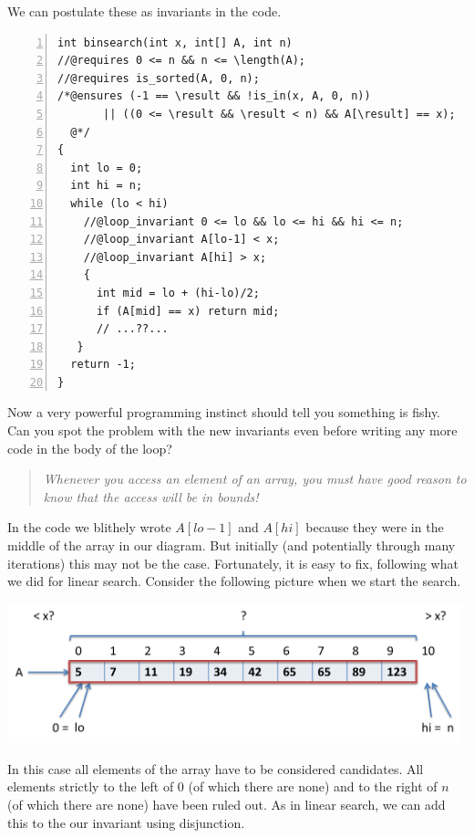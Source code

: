 We can postulate these as invariants in the code.

\clearpage
\begin{lstlisting}[language={[C0]C}, numbers=left]
int binsearch(int x, int[] A, int n)
//@requires 0 <= n && n <= \length(A);
//@requires is_sorted(A, 0, n);
/*@ensures (-1 == \result && !is_in(x, A, 0, n))
       || ((0 <= \result && \result < n) && A[\result] == x);
  @*/
{
  int lo = 0;
  int hi = n;
  while (lo < hi)
    //@loop_invariant 0 <= lo && lo <= hi && hi <= n;
    //@loop_invariant A[lo-1] < x;
    //@loop_invariant A[hi] > x;
    {
      int mid = lo + (hi-lo)/2;
      if (A[mid] == x) return mid;
      // ...??...
   }
  return -1;
}
\end{lstlisting}

Now a very powerful programming instinct should tell you something is
fishy.  Can you spot the problem with the new invariants even
before writing any more code in the body of the loop?

\clearpage
\begin{quote}\em
  Whenever you access an element of an array, you must have
  good reason to know that the access will be in bounds!
\end{quote}

In the code we blithely wrote $A[\mathit{lo}-1]$ and
$A[\mathit{hi}]$ because they were in the middle of the
array in our diagram.  But initially (and potentially
through many iterations) this may not be the case.
Fortunately, it is easy to fix, following what we did
for linear search.  Consider the following picture when
we start the search.
\begin{center}
\includegraphics[width=0.99\textwidth]{img/binsearch3.png}
\end{center}

In this case all elements of the array have to be considered
candidates.  All elements strictly to the left of $0$ (of which there
are none) and to the right of $n$ (of which there are none) have been
ruled out.  As in linear search, we can add this to the our invariant
using disjunction.

